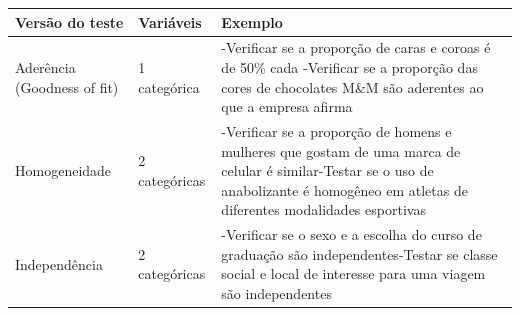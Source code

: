 \documentclass[
]{book}
\begin{document}
\begin{longtable}[]{@{}lll@{}}
\toprule
\begin{minipage}[b]{0.30\columnwidth}\raggedright
Versão do teste\strut
\end{minipage} & \begin{minipage}[b]{0.30\columnwidth}\raggedright
Variáveis\strut
\end{minipage} & \begin{minipage}[b]{0.30\columnwidth}\raggedright
Exemplo\strut
\end{minipage}\tabularnewline
\midrule
\endhead
\begin{minipage}[t]{0.30\columnwidth}\raggedright
Aderência (Goodness of fit)\strut
\end{minipage} & \begin{minipage}[t]{0.30\columnwidth}\raggedright
1 categórica\strut
\end{minipage} & \begin{minipage}[t]{0.30\columnwidth}\raggedright
-Verificar se a proporção de caras e coroas é de 50\% cada -Verificar se
a proporção das cores de chocolates M\&M são aderentes ao que a empresa
afirma\strut
\end{minipage}\tabularnewline
\begin{minipage}[t]{0.30\columnwidth}\raggedright
Homogeneidade\strut
\end{minipage} & \begin{minipage}[t]{0.30\columnwidth}\raggedright
2 categóricas\strut
\end{minipage} & \begin{minipage}[t]{0.30\columnwidth}\raggedright
-Verificar se a proporção de homens e mulheres que gostam de uma marca
de celular é similar-Testar se o uso de anabolizante é homogêneo em
atletas de diferentes modalidades esportivas\strut
\end{minipage}\tabularnewline
\begin{minipage}[t]{0.30\columnwidth}\raggedright
Independência\strut
\end{minipage} & \begin{minipage}[t]{0.30\columnwidth}\raggedright
2 categóricas\strut
\end{minipage} & \begin{minipage}[t]{0.30\columnwidth}\raggedright
-Verificar se o sexo e a escolha do curso de graduação são
independentes-Testar se classe social e local de interesse para uma
viagem são independentes\strut
\end{minipage}\tabularnewline
\bottomrule
\end{longtable}
\end{document}
